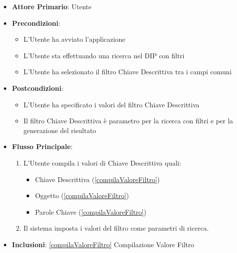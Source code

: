 \begin{itemize}
      \item \textbf{Attore Primario}: Utente
      \item \textbf{Precondizioni}: \begin{itemize}
            \item L'Utente ha avviato l'applicazione
            \item L'Utente sta effettuando una ricerca nel DIP con filtri
            \item L'Utente ha selezionato il filtro Chiave Descrittiva tra i campi comuni
      \end{itemize}
      \item \textbf{Postcondizioni}: \begin{itemize}
            \item L'Utente ha specificato i valori del filtro Chiave Descrittiva
            \item Il filtro Chiave Descrittiva è parametro per la ricerca con filtri e per la generazione del risultato
      \end{itemize}
      \item \textbf{Flusso Principale}:
            \begin{enumerate}
                  \item L'Utente compila i valori di Chiave Descrittiva quali:
                        \begin{itemize}
                              \item Chiave Descrittiva (\ref{compilaValoreFiltro})
                              \item Oggetto (\ref{compilaValoreFiltro})
                              \item Parole Chiave (\ref{compilaValoreFiltro})
                        \end{itemize}
                  \item Il sistema imposta i valori del filtro come parametri di ricerca.
            \end{enumerate}
      \item \textbf{Inclusioni}: \ref{compilaValoreFiltro} Compilazione Valore Filtro
\end{itemize}

